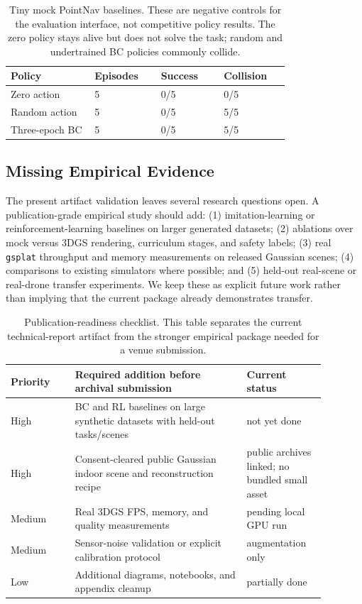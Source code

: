 \documentclass[11pt]{article}
\begin{document}
\begin{table}[t]
\centering
\begin{tabular}{p{0.24\linewidth}p{0.18\linewidth}p{0.18\linewidth}p{0.18\linewidth}}
\toprule
Policy & Episodes & Success & Collision \\
\midrule
Zero action & 5 & 0/5 & 0/5 \\
Random action & 5 & 0/5 & 5/5 \\
Three-epoch BC & 5 & 0/5 & 5/5 \\
\bottomrule
\end{tabular}
\caption{Tiny mock PointNav baselines. These are negative controls for the evaluation interface, not competitive policy results. The zero policy stays alive but does not solve the task; random and undertrained BC policies commonly collide.}
\label{tab:small-baselines}
\end{table}

\subsection{Missing Empirical Evidence}

The present artifact validation leaves several research questions open. A publication-grade empirical study should add: (1) imitation-learning or reinforcement-learning baselines on larger generated datasets; (2) ablations over mock versus 3DGS rendering, curriculum stages, and safety labels; (3) real \texttt{gsplat} throughput and memory measurements on released Gaussian scenes; (4) comparisons to existing simulators where possible; and (5) held-out real-scene or real-drone transfer experiments. We keep these as explicit future work rather than implying that the current package already demonstrates transfer.

\begin{table}[t]
\centering
\begin{tabular}{p{0.18\linewidth}p{0.48\linewidth}p{0.22\linewidth}}
\toprule
Priority & Required addition before archival submission & Current status \\
\midrule
High & BC and RL baselines on large synthetic datasets with held-out tasks/scenes & not yet done \\
High & Consent-cleared public Gaussian indoor scene and reconstruction recipe & public archives linked; no bundled small asset \\
Medium & Real 3DGS FPS, memory, and quality measurements & pending local GPU run \\
Medium & Sensor-noise validation or explicit calibration protocol & augmentation only \\
Low & Additional diagrams, notebooks, and appendix cleanup & partially done \\
\bottomrule
\end{tabular}
\caption{Publication-readiness checklist. This table separates the current technical-report artifact from the stronger empirical package needed for a venue submission.}
\label{tab:readiness}
\end{table}
\end{document}
